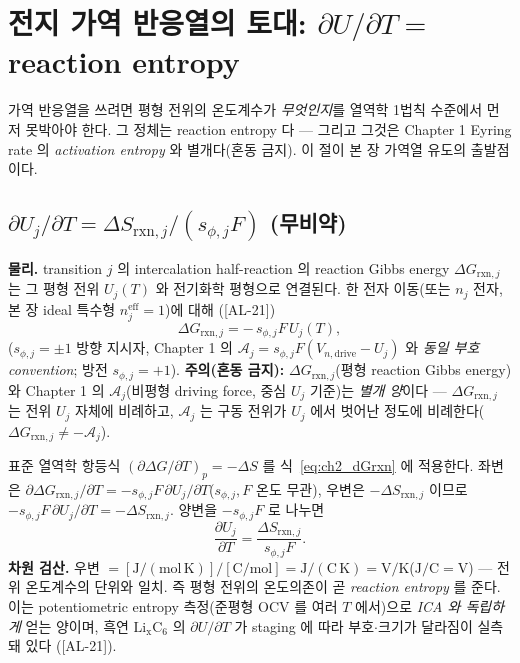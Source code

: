 \documentclass[11pt,a4paper]{article}
\newcommand{\eff}{\mathrm{eff}}
\newcommand{\drive}{\mathrm{drive}}
\newcommand{\rxn}{\mathrm{rxn}}
\newcommand{\AL}[1]{\textsf{[AL-#1]}}
\begin{document}
\section{전지 가역 반응열의 토대: $\partial U/\partial T=$ reaction entropy}\label{sec:ch2_entropy}
가역 반응열을 쓰려면 평형 전위의 온도계수가 \emph{무엇인지}를 열역학 1법칙 수준에서 먼저 못박아야 한다. 그
정체는 reaction entropy 다 — 그리고 그것은 Chapter 1 Eyring rate 의 \emph{activation entropy} 와 별개다(혼동
금지). 이 절이 본 장 가역열 유도의 출발점이다.

\subsection{$\partial U_j/\partial T=\Delta S_{\rxn,j}/(s_{\phi,j}F)$ (무비약)}\label{sec:ch2_dUdT}
\textbf{물리.} transition $j$ 의 intercalation half-reaction 의 reaction Gibbs energy $\Delta G_{\rxn,j}$ 는
그 평형 전위 $U_j(T)$ 와 전기화학 평형으로 연결된다. 한 전자 이동(또는 $n_j$ 전자, 본 장 ideal 특수형
$n_j^{\eff}=1$)에 대해 \cite{bardfaulkner,newman}(\AL{21})
\begin{equation}
\Delta G_{\rxn,j}=-\,s_{\phi,j}F\,U_j(T),
\label{eq:ch2_dGrxn}
\end{equation}
($s_{\phi,j}=\pm1$ 방향 지시자, Chapter 1 의 $\mathcal A_j=s_{\phi,j}F(V_{n,\drive}-U_j)$ 와 \emph{동일 부호
convention}; 방전 $s_{\phi,j}=+1$). \textbf{주의(혼동 금지):} $\Delta G_{\rxn,j}$(평형 reaction Gibbs energy)
와 Chapter 1 의 $\mathcal A_j$(비평형 driving force, 중심 $U_j$ 기준)는 \emph{별개 양}이다 — $\Delta G_{\rxn,j}$
는 전위 $U_j$ 자체에 비례하고, $\mathcal A_j$ 는 구동 전위가 $U_j$ 에서 벗어난 정도에 비례한다($\Delta G_{\rxn,j}\ne-\mathcal A_j$).

표준 열역학 항등식 $(\partial\Delta G/\partial T)_p=-\Delta S$ 를 식~\eqref{eq:ch2_dGrxn} 에 적용한다. 좌변은
$\partial\Delta G_{\rxn,j}/\partial T=-s_{\phi,j}F\,\partial U_j/\partial T$($s_{\phi,j},F$ 온도 무관), 우변은
$-\Delta S_{\rxn,j}$ 이므로 $-s_{\phi,j}F\,\partial U_j/\partial T=-\Delta S_{\rxn,j}$. 양변을 $-s_{\phi,j}F$
로 나누면
\begin{equation}
\boxed{\;\frac{\partial U_j}{\partial T}=\frac{\Delta S_{\rxn,j}}{s_{\phi,j}F}.\;}
\label{eq:ch2_entropy_coeff}
\end{equation}
\textbf{차원 검산.} 우변 $=[\mathrm{J/(mol\,K)}]/[\mathrm{C/mol}]=\mathrm{J/(C\,K)}=\mathrm{V/K}$($\mathrm{J/C}=\mathrm V$)
— 전위 온도계수의 단위와 일치. 즉 평형 전위의 온도의존이 곧 \emph{reaction entropy} 를 준다. 이는
potentiometric entropy 측정(준평형 OCV 를 여러 $T$ 에서)으로 \emph{ICA 와 독립하게} 얻는 양이며, 흑연
$\mathrm{Li_xC_6}$ 의 $\partial U/\partial T$ 가 staging 에 따라 부호$\cdot$크기가 달라짐이 실측돼 있다
\cite{reynier2004,thomasnewman2003}(\AL{21}).
\end{document}
